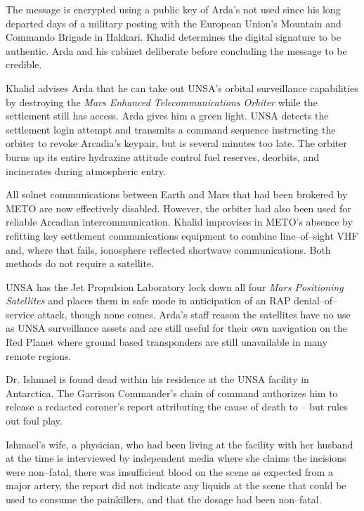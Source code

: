 The message is encrypted using a public key of Arda's not used since his long departed days of a military posting with the European Union's Mountain and Commando Brigade in Hakkari. Khalid determines the digital signature to be authentic. Arda and his cabinet deliberate before concluding the message to be credible.
\StopTimelineDate

Khalid advises Arda that he can take out UNSA's orbital surveillance capabilities by destroying the {\it Mars Enhanced Telecommunications Orbiter} while the settlement still has access. Arda gives him a green light. UNSA detects the settlement login attempt and transmits a command sequence instructing the orbiter to revoke Arcadia's keypair, but is several minutes too late. The orbiter burns up its entire hydrazine attitude control fuel reserves, deorbits, and incinerates during atmospheric entry.

All solnet communications between Earth and Mars that had been brokered by METO are now effectively disabled. However, the orbiter had also been used for reliable Arcadian intercommunication. Khalid improvises in METO's absence by refitting key settlement communications equipment to combine line--of--sight VHF and, where that fails, ionosphere reflected shortwave communications. Both methods do not require a satellite.

UNSA has the Jet Propulsion Laboratory lock down all four {\it Mars Positioning Satellites} and places them in safe mode in anticipation of an RAP denial--of--service attack, though none comes. Arda's staff reason the satellites have no use as UNSA surveillance assets and are still useful for their own navigation on the Red Planet where ground based transponders are still unavailable in many remote regions.
\StopTimelineDate

Dr. Ishmael is found dead within his residence at the UNSA facility in Antarctica. The Garrison Commander's chain of command authorizes him to release a redacted coroner's report attributing the cause of death to  -- but rules out foul play. 

Ishmael's wife, a physician, who had been living at the facility with her husband at the time is interviewed by independent media where she claims the incisions were non--fatal, there was insufficient blood on the scene as expected from a major artery, the report did not indicate any liquids at the scene that could be used to consume the painkillers, and that the dosage had been non--fatal. 

